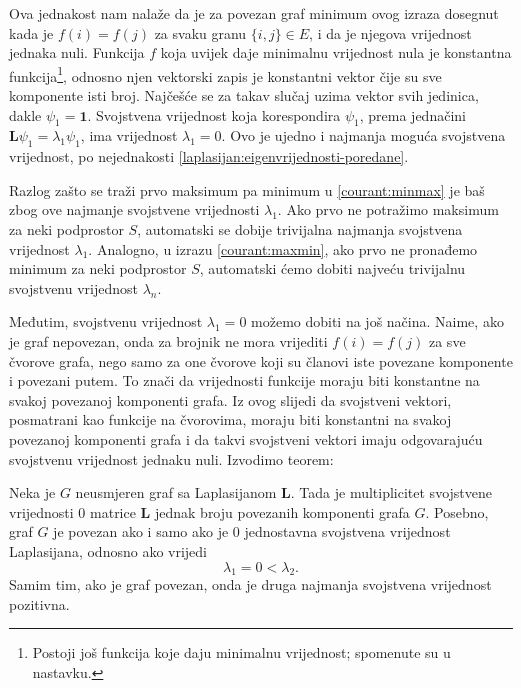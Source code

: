 Ova jednakost nam nalaže da je za povezan graf minimum ovog izraza dosegnut kada je \(f(i)=f(j)\) za svaku granu \(\{i,j\}\in E\), i da je njegova vrijednost jednaka nuli. Funkcija \(f\) koja uvijek daje minimalnu vrijednost nula je konstantna funkcija\footnote{Postoji još funkcija koje daju minimalnu vrijednost; spomenute su u nastavku.}, odnosno njen vektorski zapis je konstantni vektor čije su sve komponente isti broj. Najčešće se za takav slučaj uzima vektor svih jedinica, dakle $\psi_1=\mathbf{1}$. Svojstvena vrijednost koja korespondira $\psi_1$, prema jednačini \(\mathbf{L}\psi_1=\lambda_1\psi_1\), ima vrijednost \(\lambda_1=0\). Ovo je ujedno i najmanja moguća svojstvena vrijednost, po nejednakosti \ref{laplasijan:eigenvrijednosti-poredane}.
   
Razlog zašto se traži prvo maksimum pa minimum u \ref{courant:minmax} je baš zbog ove najmanje svojstvene vrijednosti \(\lambda_1\). Ako prvo ne potražimo maksimum za neki podprostor \(S\), automatski se dobije trivijalna najmanja svojstvena vrijednost \(\lambda_1\). Analogno, u izrazu \ref{courant:maxmin}, ako prvo ne pronađemo minimum za neki podprostor \(S\), automatski ćemo dobiti najveću trivijalnu svojstvenu vrijednost \(\lambda_n\).

Međutim, svojstvenu vrijednost \(\lambda_1=0\) možemo dobiti na još načina. Naime, ako je graf nepovezan, onda za brojnik ne mora vrijediti \(f(i)=f(j)\) za sve čvorove grafa, nego samo za one čvorove koji su članovi iste povezane komponente i povezani putem. To znači da vrijednosti funkcije moraju biti konstantne na svakoj povezanoj komponenti grafa. Iz ovog slijedi da svojstveni vektori, posmatrani kao funkcije na čvorovima, moraju biti konstantni na svakoj povezanoj komponenti grafa i da takvi svojstveni vektori imaju odgovarajuću svojstvenu vrijednost jednaku nuli. Izvodimo teorem:

\begin{theorem}\label{thm:nula-komponente}
Neka je \(G\) neusmjeren graf sa Laplasijanom \(\mathbf{L}\). 
Tada je multiplicitet svojstvene vrijednosti \(0\) matrice \(\mathbf{L}\) jednak broju povezanih komponenti grafa \(G\). Posebno, graf \(G\) je povezan ako i samo ako je \(0\) jednostavna svojstvena vrijednost Laplasijana, odnosno ako vrijedi
\begin{equation}
    \lambda_1 = 0 < \lambda_2.
\end{equation}
Samim tim, ako je graf povezan, onda je druga najmanja svojstvena vrijednost pozitivna. \cite{pan2025introduction}
\end{theorem}

